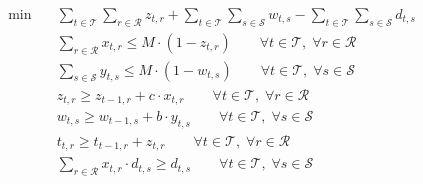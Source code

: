 \begin{align}
  \min\quad & \sum_{t \in \mathcal{T}} \sum_{r \in \mathcal{R}} z_{t,r} + \sum_{t \in \mathcal{T}} \sum_{s \in \mathcal{S}} w_{t,s} - \sum_{t \in \mathcal{T}} \sum_{s \in \mathcal{S}} d_{t,s} \tag{resilience\_optimization} \\
  & \sum_{r \in \mathcal{R}} x_{t,r} \le M \cdot (1 - z_{t,r}) \qquad \forall t \in \mathcal{T},\; \forall r \in \mathcal{R} \tag{track\_outage} \\
  & \sum_{s \in \mathcal{S}} y_{t,s} \le M \cdot (1 - w_{t,s}) \qquad \forall t \in \mathcal{T},\; \forall s \in \mathcal{S} \tag{station\_outage} \\
  & z_{t,r} \ge z_{t-1,r} + c \cdot x_{t,r} \qquad \forall t \in \mathcal{T},\; \forall r \in \mathcal{R} \tag{track\_recovery} \\
  & w_{t,s} \ge w_{t-1,s} + b \cdot y_{t,s} \qquad \forall t \in \mathcal{T},\; \forall s \in \mathcal{S} \tag{station\_recovery} \\
  & t_{t,r} \ge t_{t-1,r} + z_{t,r} \qquad \forall t \in \mathcal{T},\; \forall r \in \mathcal{R} \tag{timetable} \\
  & \sum_{r \in \mathcal{R}} x_{t,r} \cdot d_{t,s} \ge d_{t,s} \qquad \forall t \in \mathcal{T},\; \forall s \in \mathcal{S} \tag{demand} \\
\end{align}
